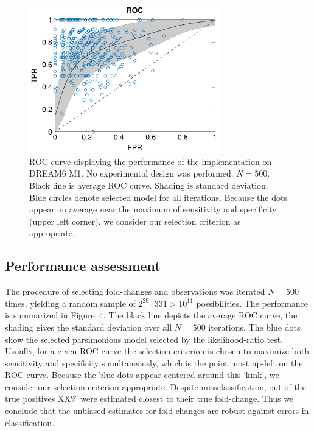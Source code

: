 \documentclass{bioinfo}
\begin{document}
\begin{figure}[!tpb]%
\centerline{\includegraphics[width=235pt]{Figures/ROC.pdf}}
\caption{ROC curve displaying the performance of the implementation on DREAM6 M1. No experimental design was performed. $N = 500$. Black line is average ROC curve. Shading is standard deviation. Blue circles denote selected model for all iterations. Because the dots appear on average near the maximum of sensitivity and specificity (upper left corner), we consider our selection criterion as appropriate.}\label{fig:04}
\end{figure}

\subsection{Performance assessment}
The procedure of selecting fold-changes and observations was iterated $N=500$ times, yielding a random sample of $2^{29} \cdot 331 > 10^{11}$ possibilities.
The performance is summarized in Figure~4\vphantom{\ref{fig:04}}.
The black line depicts the average ROC curve, the shading gives the standard deviation over all $N=500$ iterations.
The blue dots show the selected parsimonious model selected by the likelihood-ratio test.
Usually, for a given ROC curve the selection criterion is chosen to maximize both sensitivity and specificity simultaneously, which is the point most up-left on the ROC curve.
Because the blue dots appear centered around this `kink', we consider our selection criterion appropriate.
Despite missclassification, out of the true positives XX\% were estimated closest to their true fold-change.
Thus we conclude that the unbiased estimates for fold-changes are robust against errors in classification.
\end{document}

